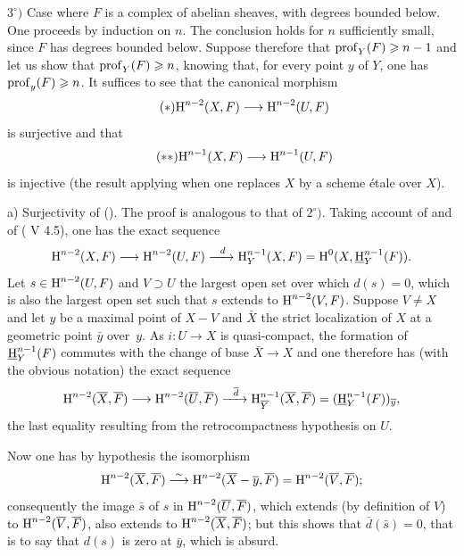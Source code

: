 $3^\circ)$ Case where $F$ is a complex of abelian sheaves, with degrees bounded below. One proceeds by induction on $n$. The conclusion holds for $n$ sufficiently small, since $F$ has degrees bounded below. Suppose therefore that $\operatorname{prof}_Y(F)\geqslant n-1$ and let us show that $\operatorname{prof}_Y(F)\geqslant n$, knowing that, for every point $y$ of $Y$, one has $\operatorname{prof}_y(F)\geqslant n$. It suffices to see that the canonical morphism
\begin{equation*} \label{eq:XIV.1.8.*} \tag{$*$} {\H^{n-2}(X, F)\to \H^{n-2}(U, F)}
\end{equation*}
is surjective and that
\begin{equation*} \label{eq:XIV.1.8.**} \tag{$**$} {\H^{n-1}(X, F)\to \H^{n-1}(U, F)}
\end{equation*}
is injective (the result applying when one replaces $X$ by a scheme \'etale over $X$).

a) Surjectivity of (). The proof is analogous to that of $2^\circ)$. Taking account of  and of ( V 4.5), one has the exact sequence
$$
\H^{n-2}(X, F)\to \H^{n-2}(U, F)\lto{d}\H^{n-1}_Y(X, F)=\H^0(X, {\h}_Y^{n-1}(F)).
$$
Let $s\in \operatorname{H}^{n-2}(U, F)$ and $V\supset U$ the largest open set over which $d(s)=0$, which is also the largest open set such that $s$ extends to $\operatorname{H}^{n-2}(V, F)$. Suppose $V\neq X$ and let $y$ be a maximal point of $X-V$ and $\bar X$ the strict localization of $X$ at a geometric point $\bar y$ over~$y$. As $i:U\to X$ is quasi-compact, the formation of ${\operatorname{\underline{H}}}_Y^{n-1}(F)$ commutes with the change of base $\bar X\to X$ and one therefore has (with the obvious notation) the exact sequence
$$
\H^{n-2}(\bar X, \bar F)\to \H^{n-2}(\bar U, \bar F)\lto{\bar d}\H^{n-1}_{\bar Y}(\bar X, \bar F)=({\h}_Y^{n-1}(F))_{\bar y},
$$
the last equality resulting from the retrocompactness hypothesis on $U$.

Now one has by hypothesis the isomorphism
$$
\operatorname{H}^{n-2}(\overline X, \overline F)\overset{\sim}{\longrightarrow} \operatorname{H}^{n-2}(\overline X-\overline y, \overline F)=\operatorname{H}^{n-2}(\overline V, \overline F);
$$
consequently the image $\bar s$ of $s$ in $\operatorname{H}^{n-2}(\overline U, \overline F)$, which extends (by definition of $V$) to $\operatorname{H}^{n-2}(\overline V, \overline F)$, also extends to $\operatorname{H}^{n-2}(\overline X, \overline F)$; but this shows that $\bar d(\bar s)=0$, that is to say that $d(s)$ is zero at $\bar y$, which is absurd.


